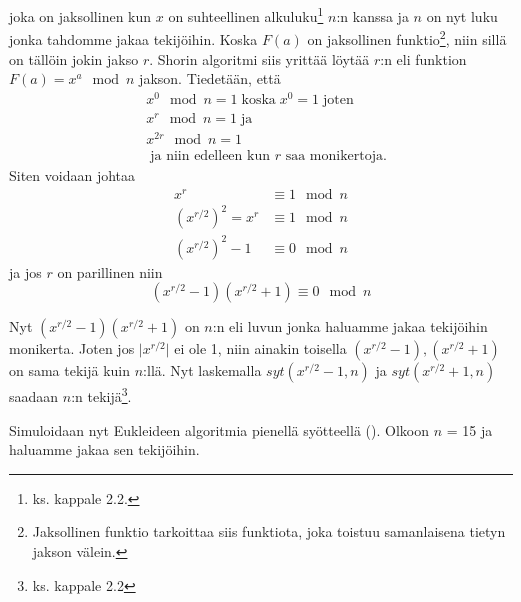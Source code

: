 joka on jaksollinen kun $x$ on suhteellinen alkuluku\footnote{ks. kappale 2.2.} $n$:n kanssa ja $n$ on nyt luku jonka tahdomme jakaa tekijöihin. Koska $F(a)$ on jaksollinen funktio\footnote{Jaksollinen funktio tarkoittaa siis funktiota, joka toistuu samanlaisena tietyn jakson välein.}, niin sillä on tällöin jokin jakso $r$. Shorin algoritmi siis yrittää löytää $r$:n eli funktion $F(a) = x^{a} \mod n$ jakson. Tiedetään, että 
\begin{equation}
    \label{eq2}
    \begin{split}
    & x^{0} \mod n = 1 \; \text{koska} \;  x^0 = 1 \; \text{joten} \\
    & x^{r} \mod n = 1 \; \text{ja} \\
    & x^{2r} \mod n = 1 \\
    & \; \text{ja niin edelleen kun $r$ saa monikertoja.}
    \end{split}
\end{equation}
Siten voidaan johtaa
\begin{equation}
    \label{eq3}
    \begin{split}
    x^{r} & \equiv 1 \mod n \\
    (x^{r/2})^{2} = x^{r} & \equiv 1 \mod n \\
    (x^{r/2})^{2} - 1 & \equiv 0 \mod n
    \end{split}
\end{equation}
ja jos $r$ on parillinen niin
\begin{equation}
    \label{eq4}
    (x^{r/2} - 1)(x^{r/2} + 1) \equiv 0 \mod n
\end{equation}

Nyt $(x^{r/2} - 1)(x^{r/2} + 1)$ on $n$:n eli luvun jonka haluamme jakaa tekijöihin monikerta. Joten jos $\lvert x^{r/2} \rvert$ ei ole 1, niin ainakin toisella $(x^{r/2} - 1), (x^{r/2} + 1)$ on sama tekijä kuin $n$:llä. Nyt laskemalla $syt(x^{r/2} - 1, n)$ ja $syt(x^{r/2} + 1, n)$ saadaan $n$:n tekijä\footnote{ks. kappale 2.2}.

Simuloidaan nyt Eukleideen algoritmia pienellä syötteellä (\cite{doi:10.1080/23742917.2016.1226650}). Olkoon $n$ = 15 ja haluamme jakaa sen tekijöihin.

